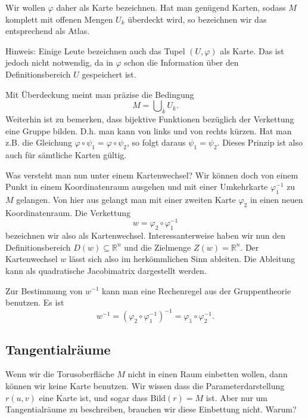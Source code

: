 \documentclass[a4paper,12pt,fleqn]{article}
\begin{document}
Wir wollen \(\varphi\) daher als Karte bezeichnen. Hat man genügend
Karten, sodass \(M\) komplett mit offenen Mengen \(U_k\) überdeckt
wird, so bezeichnen wir das entsprechend als Atlas.

Hinweis: Einige Leute bezeichnen auch das Tupel \((U,\varphi)\) als
Karte. Das ist jedoch nicht notwendig, da in \(\varphi\) schon die
Information über den Definitionsbereich \(U\) gespeichert ist.

Mit Überdeckung meint man präzise die Bedingung
\begin{equation}
M = \bigcup\nolimits_k U_k.
\end{equation}
Weiterhin ist zu bemerken, dass bijektive Funktionen bezüglich
der Verkettung eine Gruppe bilden. D.h. man kann von links und
von rechts kürzen. Hat man z.B. die Gleichung
\(\varphi\circ\psi_1 = \varphi\circ\psi_2\),
so folgt daraus \(\psi_1=\psi_2\). Dieses Prinzip ist also auch
für sämtliche Karten gültig.

Was versteht man nun unter einem Kartenwechsel?
Wir können doch von einem Punkt in einem Koordinatenraum ausgehen
und mit einer Umkehrkarte \(\varphi_1^{-1}\) zu \(M\) gelangen.
Von hier aus gelangt man mit einer zweiten Karte \(\varphi_2\)
in einen neuen Koordinatenraum. Die Verkettung
\begin{equation}
w = \varphi_2\circ\varphi_1^{-1}
\end{equation}
bezeichnen wir also als Kartenwechsel. Interessanterweise
haben wir nun den Definitionsbereich \(D(w)\subseteq\mathbb R^n\)
und die Zielmenge \(Z(w)=\mathbb R^n\). Der Kartenwechsel \(w\)
lässt sich also im herkömmlichen Sinn ableiten. Die Ableitung
kann als quadratische Jacobimatrix dargestellt werden.

Zur Bestimmung von \(w^{-1}\) kann man eine Rechenregel aus der
Gruppentheorie benutzen. Es ist
\begin{equation}
w^{-1} = (\varphi_2\circ\varphi_1^{-1})^{-1}
= \varphi_1\circ\varphi_2^{-1}.
\end{equation}

\subsection{Tangentialräume}
Wenn wir die Torusoberfläche \(M\) nicht in einen Raum einbetten
wollen, dann können wir keine Karte benutzen. Wir wissen dass die
Parameterdarstellung \(r(u,v)\) eine Karte ist, und sogar dass
\(\mathrm{Bild}(r)=M\) ist. Aber nur um Tangentialräume zu
beschreiben, brauchen wir diese Einbettung nicht. Warum? 
\end{document}
